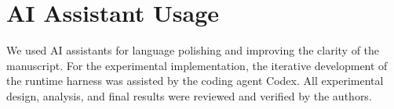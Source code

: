 \section{AI Assistant Usage}
We used AI assistants for language polishing and improving the clarity of the manuscript. 
For the experimental implementation, the iterative development of the runtime harness was assisted by the coding agent Codex. 
All experimental design, analysis, and final results were reviewed and verified by the authors.
